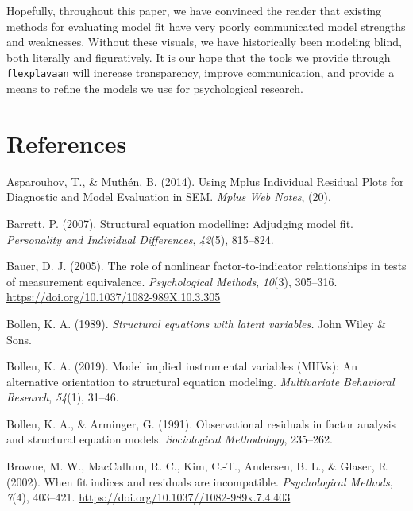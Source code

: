 \documentclass[
  english,
  man]{apa6}
\newlength{\cslhangindent}
\newenvironment{cslreferences}%
  {\setlength{\parindent}{0pt}%
  \everypar{\setlength{\hangindent}{\cslhangindent}}\ignorespaces}%
  {\par}
\begin{document}
Hopefully, throughout this paper, we have convinced the reader that existing methods for evaluating model fit have very poorly communicated model strengths and weaknesses. Without these visuals, we have historically been modeling blind, both literally and figuratively. It is our hope that the tools we provide through \texttt{flexplavaan} will increase transparency, improve communication, and provide a means to refine the models we use for psychological research.

\hypertarget{references}{%
\section{References}\label{references}}

\hypertarget{refs}{}
\begin{cslreferences}
\leavevmode\hypertarget{ref-asparouhov2014using}{}%
Asparouhov, T., \& Muthén, B. (2014). Using Mplus Individual Residual Plots for Diagnostic and Model Evaluation in SEM. \emph{Mplus Web Notes}, (20).

\leavevmode\hypertarget{ref-barrett2007structural}{}%
Barrett, P. (2007). Structural equation modelling: Adjudging model fit. \emph{Personality and Individual Differences}, \emph{42}(5), 815--824.

\leavevmode\hypertarget{ref-Bauer2005}{}%
Bauer, D. J. (2005). The role of nonlinear factor-to-indicator relationships in tests of measurement equivalence. \emph{Psychological Methods}, \emph{10}(3), 305--316. \url{https://doi.org/10.1037/1082-989X.10.3.305}

\leavevmode\hypertarget{ref-bollen_structural_1989}{}%
Bollen, K. A. (1989). \emph{Structural equations with latent variables.} John Wiley \& Sons.

\leavevmode\hypertarget{ref-bollen2019model}{}%
Bollen, K. A. (2019). Model implied instrumental variables (MIIVs): An alternative orientation to structural equation modeling. \emph{Multivariate Behavioral Research}, \emph{54}(1), 31--46.

\leavevmode\hypertarget{ref-bollen1991observational}{}%
Bollen, K. A., \& Arminger, G. (1991). Observational residuals in factor analysis and structural equation models. \emph{Sociological Methodology}, 235--262.

\leavevmode\hypertarget{ref-Browne2002}{}%
Browne, M. W., MacCallum, R. C., Kim, C.-T., Andersen, B. L., \& Glaser, R. (2002). When fit indices and residuals are incompatible. \emph{Psychological Methods}, \emph{7}(4), 403--421. \url{https://doi.org/10.1037//1082-989x.7.4.403}


\end{cslreferences}
\end{document}
